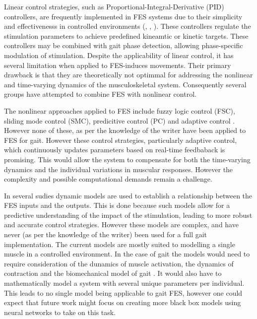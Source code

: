 Linear control strategies, such as Proportional-Integral-Derivative (PID) controllers, are frequently implemented in FES systems due to their simplicity and effectivenesss in controlled environments (\cite{chaikho_transcutaneous_2022}, \cite{bouri_closed-loop_2018}, \cite{dodson_experimental_2017}). These controllers regulate the stimulation parameters to achieve predefined kineamtic or kinetic targets. These controllers may be combined with gait phase detection, allowing phase-specific modulation of stimulation. Despite the applicability of linear control, it has several limitation when applied to FES-induces movements. Their primary drawback is that they are theoretically not optimmal for addressing the nonlinear and time-varying dynamics of the musculoskeletal system. Consequently several groups have attempted to combine FES with nonlinear control.

The nonlinear approaches applied to FES include fuzzy logic control (FSC), sliding mode control (SMC), predicitive control (PC) and adaptive control \cite{chaikho_transcutaneous_2022} . However none of these, as per the knowledge of the writer have been applied to FES for gait. However these control strategies, particularly adaptive control, which continuously updates parameters based on real-time feedbaback is promising. This would allow the system to compensate for both the time-varying dynamics and the individual variations in muscular responses. However the complexity and possible computational demands remain a challenge. 

In several sudies  dynamic models are used to establish a relationship between the FES inputs and the outputs. This is done because such models allow for a predictive understanding of the impact of the stimulation, leading to more robust and accurate control strategies. However these models are complex, and have never (as per the knowledge of the writer) been used for a full gait implementation. The current models  are mostly suited to modelling a single muscle in a controlled environment. In the case of gait the models would need to require consideration of the dunamics of muscle activation, the dynamics of contraction and the biomechanical model of gait \cite{chaikho_transcutaneous_2022}. It would also have to mathematically model a system with several unique parameters per individual. This leads to no single model being applicable to gait FES, however one could expect that future work might focus on creating more black box models using neural networks to take on this task.

